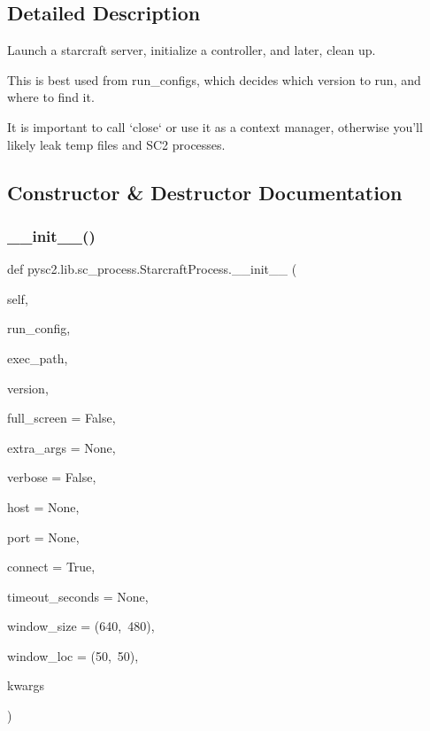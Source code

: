 \subsection{Detailed Description}
\begin{DoxyVerb}Launch a starcraft server, initialize a controller, and later, clean up.

This is best used from run_configs, which decides which version to run, and
where to find it.

It is important to call `close` or use it as a context manager, otherwise
you'll likely leak temp files and SC2 processes.
\end{DoxyVerb}
 

\subsection{Constructor \& Destructor Documentation}
\mbox{\label{classpysc2_1_1lib_1_1sc__process_1_1_starcraft_process_a2ed5e56a2a9ee1fd1ff65d9391d64576}} 
\subsubsection{\texorpdfstring{\+\_\+\+\_\+init\+\_\+\+\_\+()}{\_\_init\_\_()}}
{\footnotesize\ttfamily def pysc2.\+lib.\+sc\+\_\+process.\+Starcraft\+Process.\+\_\+\+\_\+init\+\_\+\+\_\+ (\begin{DoxyParamCaption}\item[{}]{self,  }\item[{}]{run\+\_\+config,  }\item[{}]{exec\+\_\+path,  }\item[{}]{version,  }\item[{}]{full\+\_\+screen = {\ttfamily False},  }\item[{}]{extra\+\_\+args = {\ttfamily None},  }\item[{}]{verbose = {\ttfamily False},  }\item[{}]{host = {\ttfamily None},  }\item[{}]{port = {\ttfamily None},  }\item[{}]{connect = {\ttfamily True},  }\item[{}]{timeout\+\_\+seconds = {\ttfamily None},  }\item[{}]{window\+\_\+size = {\ttfamily (640,~480)},  }\item[{}]{window\+\_\+loc = {\ttfamily (50,~50)},  }\item[{}]{kwargs }\end{DoxyParamCaption})}

